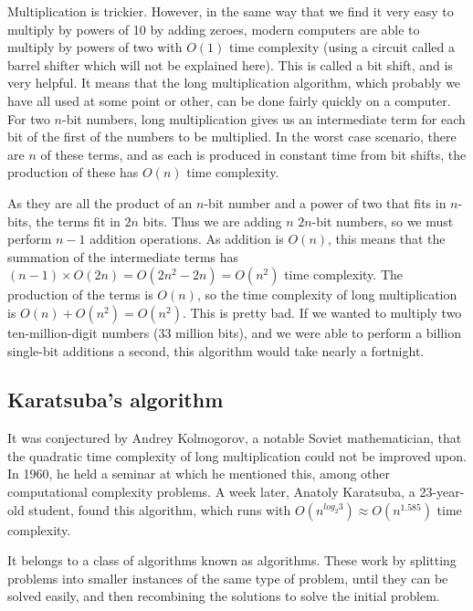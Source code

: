 \documentclass[12pt,a4paper]{report}
\begin{document}
\begin{multicols}{2}
\begin{multicols}{2}
Multiplication is trickier. However, in the same way that we find it very easy to multiply by powers of 10 by adding zeroes, modern computers are able to multiply by powers of two with \(O(1)\) time complexity (using a circuit called a barrel shifter which will not be explained here). This is called a bit shift, and is very helpful. It means that the long multiplication algorithm, which probably we have all used at some point or other, can be done fairly quickly on a computer. For two \(n\)-bit numbers, long multiplication gives us an intermediate term for each  bit of the first of the numbers to be multiplied. In the worst case scenario, there are \(n\) of these terms, and as each is produced in constant time from bit shifts, the production of these has \(O(n)\) time complexity.

As they are all the product of an \(n\)-bit number and a power of two that fits in \(n\)-bits, the terms fit in \(2n\) bits. Thus we are adding \(n\) \(2n\)-bit numbers, so we must perform \(n-1\) addition operations. As addition is \(O(n)\), this means that the summation of the intermediate terms has \((n-1)\times{}O(2n)=O(2n^2-2n)=O(n^2)\) time complexity. The production of the terms is \(O(n)\), so the time complexity of long multiplication is \(O(n)+O(n^2)=O(n^2)\). This is pretty bad. If we wanted to multiply two ten-million-digit numbers (33 million bits), and we were able to perform a billion single-bit additions a second, this algorithm would take nearly a fortnight.

\subsection{Karatsuba's algorithm}

It was conjectured by Andrey Kolmogorov, a notable Soviet mathematician, that the quadratic time complexity of long multiplication could not be improved upon. In 1960, he held a seminar at which he mentioned this, among other computational complexity problems. A week later, Anatoly Karatsuba, a 23-year-old student, found this algorithm, which runs with \(O(n^{log_{2}3})\approx{}O(n^{1.585})\) time complexity.

It belongs to a class of algorithms known as  algorithms. These work by splitting problems into smaller instances of the same type of problem, until they can be solved easily, and then recombining the solutions to solve the initial problem.


\end{multicols}
\end{multicols}
\end{document}
